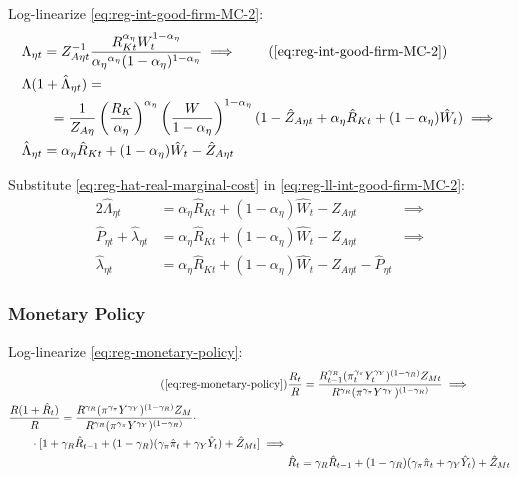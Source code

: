 \documentclass[
thesis.tex
]{subfiles}
\begin{document}
Log-linearize \ref{eq:reg-int-good-firm-MC-2}:
\begin{alignat}{2}
	& \Lambda_{\eta t} = Z_{A\eta t}^{-1} \frac{R_{Kt}^{{\alpha_{\eta}}} W_t^{1-{\alpha_{\eta}}}}{{\alpha_{\eta}}^{{\alpha_{\eta}}} (1-{\alpha_{\eta}})^{1-{\alpha_{\eta}}}} \implies \tag{\ref{eq:reg-int-good-firm-MC-2}} \\
	& \Lambda (1+ \hat{\Lambda}_{\eta t}) = \nonumber \\ & \qquad = \frac{1}{Z_{A\eta}} \left( \frac{R_{K}}{{\alpha_{\eta}}} \right)^{{\alpha_{\eta}}} \left( \frac{W}{1-{\alpha_{\eta}}} \right)^{1-{\alpha_{\eta}}} (1- \hat{Z}_{A\eta t} + {\alpha_{\eta}} \hat{R}_{Kt} + (1- {\alpha_{\eta}}) \hat{W}_{t} ) \implies \nonumber \\
	& \hat{\Lambda}_{\eta t} = {\alpha_{\eta}} \hat{R}_{Kt} + (1- {\alpha_{\eta}}) \hat{W}_{t} - \hat{Z}_{A\eta t} \label{eq:reg-ll-int-good-firm-MC-2}
\end{alignat}

Substitute \ref{eq:reg-hat-real-marginal-cost} in \ref{eq:reg-ll-int-good-firm-MC-2}:
\begin{alignat}{2}
	\hat{\Lambda}_{\eta t} &= {\alpha_{\eta}} \hat{R}_{Kt} + (1- {\alpha_{\eta}}) \hat{W}_{t} - \hat{Z}_{A\eta t} &\implies \nonumber \\
	\hat{P}_{\eta t} + \hat{\lambda}_{\eta t} &= {\alpha_{\eta}} \hat{R}_{Kt} + (1- {\alpha_{\eta}}) \hat{W}_{t} - \hat{Z}_{A\eta t} &\implies \nonumber \\
	\hat{\lambda}_{\eta t} &= {\alpha_{\eta}} \hat{R}_{Kt} + (1- {\alpha_{\eta}}) \hat{W}_{t} - \hat{Z}_{A\eta t} - \hat{P}_{\eta t} \label{eq:reg-ll-int-good-firm-MC-3}
\end{alignat}


\subsubsection*{Monetary Policy}

Log-linearize \ref{eq:reg-monetary-policy}:
\begin{align}
	\tag{\ref{eq:reg-monetary-policy}}
	& \frac{R_{t}}{R} = \frac{R_{t-1}^{\gamma_R} (\pi_t^{\gamma_\pi} Y_{t}^{\gamma_Y})^{(1-\gamma_R)} Z_{Mt}}{R^{\gamma_R} (\pi^{\gamma_\pi} Y^{\gamma_Y})^{(1-\gamma_R)}} \implies \\
	\begin{split}
		& \frac{R(1+ \hat{R}_t)}{R} = \frac{ R^{\gamma_R} (\pi^{\gamma_\pi} Y^{\gamma_Y})^{(1-\gamma_R)} Z_{M}}{R^{\gamma_R} (\pi^{\gamma_\pi} Y^{\gamma_Y})^{(1-\gamma_R)}} \cdot \\
		& \qquad \cdot [1+ \gamma_R \hat{R}_{t-1} + (1-\gamma_R)(\gamma_\pi \hat{\pi}_t + \gamma_Y \hat{Y}_t) + \hat{Z}_{Mt}] \implies
	\end{split} \nonumber \\
	& \hat{R}_t = \gamma_R \hat{R}_{t-1} + (1-\gamma_R)(\gamma_\pi \hat{\pi}_t + \gamma_Y \hat{Y}_t) + \hat{Z}_{Mt} \label{eq:reg-ll-monetary-policy}
\end{align}
\end{document}
